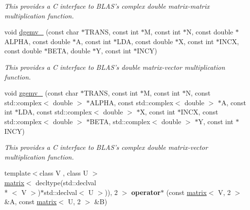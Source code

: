 \begin{DoxyCompactItemize}
\begin{DoxyCompactList}\small\item\em This provides a C interface to B\-L\-A\-S's complex double matrix-\/matrix multiplication function. \end{DoxyCompactList}\item 
\hypertarget{namespacekeycpp_af0676a4a89dbb63f09fc627c05e12699}{void \hyperlink{namespacekeycpp_af0676a4a89dbb63f09fc627c05e12699}{dgemv\-\_\-} (const char $\ast$T\-R\-A\-N\-S, const int $\ast$M, const int $\ast$N, const double $\ast$A\-L\-P\-H\-A, const double $\ast$A, const int $\ast$L\-D\-A, const double $\ast$X, const int $\ast$I\-N\-C\-X, const double $\ast$B\-E\-T\-A, double $\ast$Y, const int $\ast$I\-N\-C\-Y)}\label{namespacekeycpp_af0676a4a89dbb63f09fc627c05e12699}

\begin{DoxyCompactList}\small\item\em This provides a C interface to B\-L\-A\-S's double matrix-\/vector multiplication function. \end{DoxyCompactList}\item 
\hypertarget{namespacekeycpp_aea174778653491b5fd21dd2960c0f7cb}{void \hyperlink{namespacekeycpp_aea174778653491b5fd21dd2960c0f7cb}{zgemv\-\_\-} (const char $\ast$T\-R\-A\-N\-S, const int $\ast$M, const int $\ast$N, const std\-::complex$<$ double $>$ $\ast$A\-L\-P\-H\-A, const std\-::complex$<$ double $>$ $\ast$A, const int $\ast$L\-D\-A, const std\-::complex$<$ double $>$ $\ast$X, const int $\ast$I\-N\-C\-X, const std\-::complex$<$ double $>$ $\ast$B\-E\-T\-A, std\-::complex$<$ double $>$ $\ast$Y, const int $\ast$I\-N\-C\-Y)}\label{namespacekeycpp_aea174778653491b5fd21dd2960c0f7cb}

\begin{DoxyCompactList}\small\item\em This provides a C interface to B\-L\-A\-S's complex double matrix-\/vector multiplication function. \end{DoxyCompactList}\item 
\hypertarget{namespacekeycpp_acd7bbf24fe4142557beec72e40dd1975}{{\footnotesize template$<$class V , class U $>$ }\\\hyperlink{classkeycpp_1_1matrix}{matrix}$<$ decltype(std\-::declval\\*
$<$ V $>$)$\ast$std\-::declval$<$ U $>$)), 2 $>$ {\bfseries operator$\ast$} (const \hyperlink{classkeycpp_1_1matrix}{matrix}$<$ V, 2 $>$ \&A, const \hyperlink{classkeycpp_1_1matrix}{matrix}$<$ U, 2 $>$ \&B)}\label{namespacekeycpp_acd7bbf24fe4142557beec72e40dd1975}


\end{DoxyCompactItemize}
